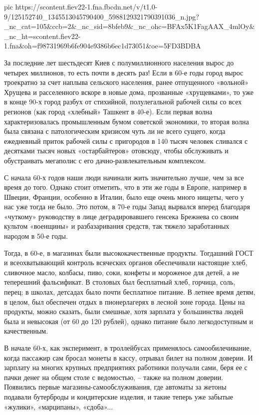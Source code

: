 pic https://scontent.fiev22-1.fna.fbcdn.net/v/t1.0-9/125152740_1345513045790400_5988129321790391036_n.jpg?_nc_cat=105&ccb=2&_nc_sid=8bfeb9&_nc_ohc=BFAx5K1FagAAX_4mlOy&_nc_ht=scontent.fiev22-1.fna&oh=f98731969b6fe904e9386b6ec1d73051&oe=5FD3BDBA
\fi

За последние лет шестьдесят Киев с полумиллионного населения вырос до четырех
миллионов, то есть почти в десять раз! Если в 60-е годы город вырос троекратно
за счет наплыва сельского населения, ранее отпущенного «вольной» Хрущева и
расселенного вскоре в новые дома, прозванные «хрущевками», то уже в конце 90-х
город разбух от стихийной, полулегальной рабочей силы со всех регионов (как
город «хлебный» Ташкент в 40-е). Если первая волна характеризовалась
промышленным бумом советской экономики, то вторая волна была связана с
патологическим кризисом чуть ли не всего сущего, когда ежедневный приток
рабочей силы с пригородов в 140 тысяч человек сливался с десятками тысяч новых
«остарбайтеров» отовсюду, чтобы обслуживать и обустраивать мегаполис с его
дачно-развлекательным комплексом.

С начала 60-х годов наши люди начинали жить значительно лучше, чем за все время до того. Однако стоит отметить, что в эти же годы в Европе, например в Швеции, Франции, особенно в Италии, было еще очень много нищеты, чего у нас уже тогда не было. Это потом, в 70-е годы Запад вырвался вперед благодаря «чуткому» руководству в лице деградировавшего генсека Брежнева со своим культом «военщины» и разбазаривания средств, так тяжело заработанных народом в 50-е годы. 

Тогда, в 60-е, в магазинах были высококачественные продукты. Тогдашний ГОСТ и
всеохватывающий контроль всяческих органов обеспечивали настоящие хлеб,
сливочное масло, колбасы, пиво, соки, конфеты и мороженое для детей, а не
теперешний фальсификат. В столовых был бесплатный хлеб, горчица, соль, перец; в
школах, детсадах было почти бесплатное питание. В летнее время детям, в целом,
был обеспечен отдых в пионерлагерях в лесной зоне города. Цены на продукты,
можно сказать, были смешные, хотя зарплата у большинства людей была и невысокая
(от 60 до 120 рублей), однако питание было легкодоступным и качественным. 

В начале 60-х, как эксперимент, в троллейбусах применялось самообилечивание,
когда пассажир сам бросал монеты в кассу, отрывал билет на полном доверии. И
зарплату на многих крупных предприятиях работники получали сами, беря ее с
пачки денег на общем столе с ведомостью, – также на полном доверии. Появились
первые магазины-самообслуживания, где автоматы за жетоны подавали бутерброды и
кондитерские изделия, и такие теперь уже забытые «жулики», «марципаны»,
«сдоба»... 

